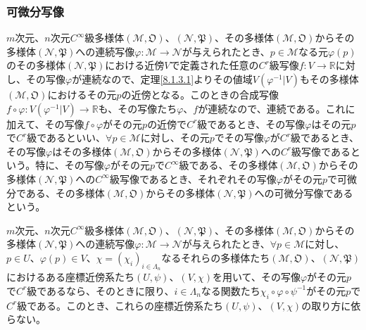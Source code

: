 \documentclass[dvipdfmx]{jsarticle}
\begin{document}
\subsubsection{可微分写像}
\begin{dfn}
$m$次元、$n$次元$C^\infty $級多様体$\left( \mathcal{M},\mathfrak{O} \right) $、$\left( \mathcal{N},\mathfrak{P} \right) $、その多様体$\left( \mathcal{M},\mathfrak{O} \right) $からその多様体$\left( \mathcal{N},\mathfrak{P} \right) $への連続写像$\varphi :\mathcal{M} \rightarrow \mathcal{N} $が与えられたとき、$p\in \mathcal{M}$なる元$\varphi (p)$のその多様体$\left( \mathcal{N},\mathfrak{P} \right) $における近傍$V$で定義された任意の$C^r $級写像$f:V\rightarrow \mathbb{R} $に対し、その写像$\varphi $が連続なので、定理\ref{8.1.3.1}よりその値域$V\left(\varphi^{-1} | V\right)$もその多様体$\left( \mathcal{M},\mathfrak{O} \right) $におけるその元$p$の近傍となる。このときの合成写像$f\circ \varphi : V\left(\varphi^{-1} | V\right) \rightarrow \mathbb{R} $も、その写像たち$\varphi $、$f$が連続なので、連続である。これに加えて、その写像$f\circ \varphi $がその元$p$の近傍で$C^r $級であるとき、その写像$\varphi $はその元$p$で$C^r $級であるといい、$\forall p\in \mathcal{M} $に対し、その元$p$でその写像$\varphi $が$C^r $級であるとき、その写像$\varphi $はその多様体$\left( \mathcal{M},\mathfrak{O} \right) $からその多様体$\left( \mathcal{N},\mathfrak{P} \right) $への$C^r $級写像であるという。特に、その写像$\varphi $がその元$p$で$C^\infty $級である、その多様体$\left( \mathcal{M},\mathfrak{O} \right) $からその多様体$\left( \mathcal{N},\mathfrak{P} \right) $への$C^\infty $級写像であるとき、それぞれその写像$\varphi $がその元$p$で可微分である、その多様体$\left( \mathcal{M},\mathfrak{O} \right) $からその多様体$\left( \mathcal{N},\mathfrak{P} \right) $への可微分写像であるという。
\end{dfn}
\begin{thm}\label{8.3.2.9}
$m$次元、$n$次元$C^\infty $級多様体$\left( \mathcal{M},\mathfrak{O} \right) $、$\left( \mathcal{N},\mathfrak{P} \right) $、その多様体$\left( \mathcal{M},\mathfrak{O} \right) $からその多様体$\left( \mathcal{N},\mathfrak{P} \right) $への連続写像$\varphi :\mathcal{M} \rightarrow \mathcal{N} $が与えられたとき、$\forall p\in \mathcal{M}$に対し、$p\in U$、$\varphi \left(p\right) \in V$、$\chi=\left(\chi_i \right)_{i\in \varLambda_n }$なるそれらの多様体たち$\left(\mathcal{M},\mathfrak{O}\right)$、$\left(\mathcal{N},\mathfrak{P}\right)$におけるある座標近傍系たち$\left(U,\psi\right)$、$\left(V,\chi\right)$を用いて、その写像$\varphi $がその元$p$で$C^r $級であるなら、そのときに限り、$i\in \varLambda_n $なる関数たち$\chi_i \circ \varphi \circ \psi^{-1} $がその元$p$で$C^r $級である。このとき、これらの座標近傍系たち$\left(U,\psi\right)$、$\left(V,\chi\right)$の取り方に依らない。
\end{thm}\par
\end{document}
